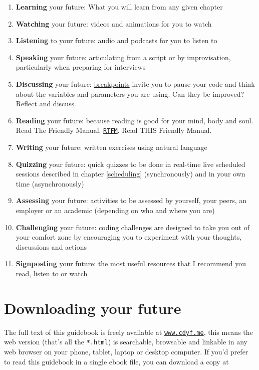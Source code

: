 \documentclass[
]{book}
\providecommand{\tightlist}{%
  \setlength{\itemsep}{0pt}\setlength{\parskip}{0pt}}
\begin{document}
\begin{enumerate}
\def\labelenumi{\arabic{enumi}.}
\tightlist
\item
  \textbf{Learning} your future: What you will learn from any given chapter
\item
  \textbf{Watching} your future: videos and animations for you to watch
\item
  \textbf{Listening} to your future: audio and podcasts for you to listen to
\item
  \textbf{Speaking} your future: articulating from a script or by improvisation, particularly when preparing for interviews
\item
  \textbf{Discussing} your future: \href{https://en.wikipedia.org/wiki/Breakpoint}{breakpoints} invite you to pause your code and think about the variables and parameters you are using. Can they be improved? Reflect and discuss.
\item
  \textbf{Reading} your future: because reading is good for your mind, body and soul. Read The Friendly Manual. \href{https://en.wikipedia.org/wiki/RTFM}{\texttt{RTFM}}. Read THIS Friendly Manual.
\item
  \textbf{Writing} your future: written exercises using natural language
\item
  \textbf{Quizzing} your future: quick quizzes to be done in real-time live scheduled sessions described in chapter \ref{scheduling} (synchronously) and in your own time (asynchronously)
\item
  \textbf{Assessing} your future: activities to be assessed by yourself, your peers, an employer or an academic (depending on who and where you are)
\item
  \textbf{Challenging} your future: coding challenges are designed to take you out of your comfort zone by encouraging you to experiment with your thoughts, discussions and actions
\item
  \textbf{Signposting} your future: the most useful resources that I recommend you read, listen to or watch
\end{enumerate}

\hypertarget{downloading}{%
\section{Downloading your future}\label{downloading}}

The full text of this guidebook is freely available at \href{https://www.cdyf.me/}{\texttt{www.cdyf.me}}, this means the web version (that's all the \texttt{*.html}) is searchable, browsable and linkable in any web browser on your phone, tablet, laptop or desktop computer. If you'd prefer to read this guidebook in a single ebook file, you can download a copy at
\end{document}
